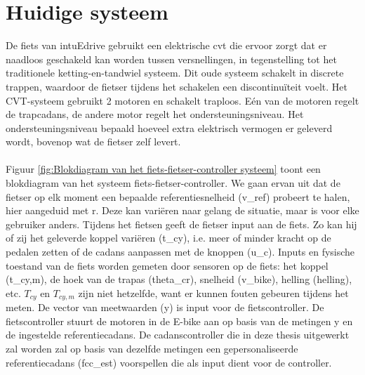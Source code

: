 \section{Huidige systeem}
De fiets van intuEdrive gebruikt een elektrische \gls{cvt} die ervoor zorgt dat er naadloos geschakeld kan worden tussen versnellingen, in tegenstelling tot het traditionele ketting-en-tandwiel systeem. Dit oude systeem schakelt in discrete trappen, waardoor de fietser tijdens het schakelen een discontinuïteit voelt. Het CVT-systeem gebruikt 2 motoren en schakelt traploos. Eén van de motoren regelt de trapcadans, de andere motor regelt het ondersteuningsniveau. Het ondersteuningsniveau bepaald hoeveel extra elektrisch vermogen er geleverd wordt, bovenop wat de fietser zelf levert.
\\\\
Figuur \ref{fig:Blokdiagram van het fiets-fietser-controller systeem} toont een blokdiagram van het systeem fiets-fietser-controller. We gaan ervan uit dat de fietser op elk moment een bepaalde referentiesnelheid (\gls{v_ref}) probeert te halen, hier aangeduid met r. Deze kan variëren naar gelang de situatie, maar is voor elke gebruiker anders. Tijdens het fietsen geeft de fietser input aan de fiets. Zo kan hij of zij het geleverde koppel variëren (\gls{t_cy}), i.e. meer of minder kracht op de pedalen zetten of de cadans aanpassen met de knoppen (\gls{u_c}). Inputs en fysische toestand van de fiets worden gemeten door sensoren op de fiets: het koppel (\gls{t_cy,m}), de hoek van de trapas (\gls{theta_cr}), snelheid (\gls{v_bike}), helling (\gls{helling}), etc. $T_{cy}$ en $T_{cy,m}$ zijn niet hetzelfde, want er kunnen fouten gebeuren tijdens het meten. De vector van meetwaarden (\gls{y}) is input voor de fietscontroller. De fietscontroller stuurt de motoren in de E-bike aan op basis van de metingen \gls{y} en de ingestelde referentiecadans. De cadanscontroller die in deze thesis uitgewerkt zal worden zal op basis van dezelfde metingen een gepersonaliseerde referentiecadans (\gls{fcc_est}) voorspellen die als input dient voor de controller.
